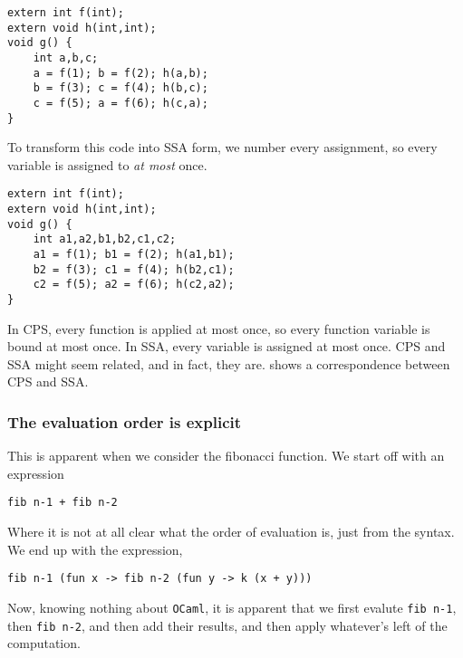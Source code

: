 \begin{code}
\label{code:c-not-ssa}
\begin{verbatim}
extern int f(int); 
extern void h(int,int); 
void g() {   
    int a,b,c;   
    a = f(1); b = f(2); h(a,b);   
    b = f(3); c = f(4); h(b,c);   
    c = f(5); a = f(6); h(c,a); 
}
\end{verbatim}
\end{code}

To transform this code into SSA form, we number every assignment, so every variable is assigned to \emph{at most} once. 

\begin{code}
\label{code:c-ssa}
\begin{verbatim}
extern int f(int); 
extern void h(int,int); 
void g() {   
    int a1,a2,b1,b2,c1,c2;   
    a1 = f(1); b1 = f(2); h(a1,b1);   
    b2 = f(3); c1 = f(4); h(b2,c1);   
    c2 = f(5); a2 = f(6); h(c2,a2); 
}
\end{verbatim}
\end{code}

In CPS, every function is applied at most once, so every function variable is bound at most once. In SSA, every variable is assigned at most once. CPS and SSA might seem related, and in fact, they are. \citet{kelsey-1995} shows a correspondence between CPS and SSA. 

\subsubsection{The evaluation order is explicit}
This is apparent when we consider the fibonacci function. We start off with an expression
\begin{verbatim}
fib n-1 + fib n-2
\end{verbatim}
Where it is not at all clear what the order of evaluation is, just from the syntax. We end up with the expression,
\begin{verbatim}
fib n-1 (fun x -> fib n-2 (fun y -> k (x + y))) 
\end{verbatim}
Now, knowing nothing about \texttt{OCaml}, it is apparent that we first evalute \texttt{fib n-1}, then \texttt{fib n-2}, and then add their results, and then apply whatever's left of the computation. 

